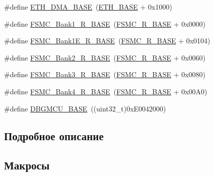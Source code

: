 \begin{DoxyCompactItemize}
\item 
\#define \mbox{\hyperlink{group___peripheral__memory__map_gace2114e1b37c1ba88d60f3e831b67e93}{E\+T\+H\+\_\+\+D\+M\+A\+\_\+\+B\+A\+SE}}~(\mbox{\hyperlink{group___peripheral__memory__map_gad965a7b1106ece575ed3da10c45c65cc}{E\+T\+H\+\_\+\+B\+A\+SE}} + 0x1000)
\item 
\#define \mbox{\hyperlink{group___peripheral__memory__map_gad196fe6f5e4041b201d14f43508c06d2}{F\+S\+M\+C\+\_\+\+Bank1\+\_\+\+R\+\_\+\+B\+A\+SE}}~(\mbox{\hyperlink{group___peripheral__memory__map_gaddf0e199dccba83272b20c9fb4d3aaed}{F\+S\+M\+C\+\_\+\+R\+\_\+\+B\+A\+SE}} + 0x0000)
\item 
\#define \mbox{\hyperlink{group___peripheral__memory__map_gaea182589c84aee30b7f735474d8774e2}{F\+S\+M\+C\+\_\+\+Bank1\+E\+\_\+\+R\+\_\+\+B\+A\+SE}}~(\mbox{\hyperlink{group___peripheral__memory__map_gaddf0e199dccba83272b20c9fb4d3aaed}{F\+S\+M\+C\+\_\+\+R\+\_\+\+B\+A\+SE}} + 0x0104)
\item 
\#define \mbox{\hyperlink{group___peripheral__memory__map_ga3cb46d62f4f6458e186a5a4c753e4918}{F\+S\+M\+C\+\_\+\+Bank2\+\_\+\+R\+\_\+\+B\+A\+SE}}~(\mbox{\hyperlink{group___peripheral__memory__map_gaddf0e199dccba83272b20c9fb4d3aaed}{F\+S\+M\+C\+\_\+\+R\+\_\+\+B\+A\+SE}} + 0x0060)
\item 
\#define \mbox{\hyperlink{group___peripheral__memory__map_gacf056152c9e5aefcc67db78d1302c0d7}{F\+S\+M\+C\+\_\+\+Bank3\+\_\+\+R\+\_\+\+B\+A\+SE}}~(\mbox{\hyperlink{group___peripheral__memory__map_gaddf0e199dccba83272b20c9fb4d3aaed}{F\+S\+M\+C\+\_\+\+R\+\_\+\+B\+A\+SE}} + 0x0080)
\item 
\#define \mbox{\hyperlink{group___peripheral__memory__map_gaf9e5417133160b0bdd0498d982acec19}{F\+S\+M\+C\+\_\+\+Bank4\+\_\+\+R\+\_\+\+B\+A\+SE}}~(\mbox{\hyperlink{group___peripheral__memory__map_gaddf0e199dccba83272b20c9fb4d3aaed}{F\+S\+M\+C\+\_\+\+R\+\_\+\+B\+A\+SE}} + 0x00\+A0)
\item 
\#define \mbox{\hyperlink{group___peripheral__memory__map_ga4adaf4fd82ccc3a538f1f27a70cdbbef}{D\+B\+G\+M\+C\+U\+\_\+\+B\+A\+SE}}~((uint32\+\_\+t)0x\+E0042000)
\end{DoxyCompactItemize}


\subsection{Подробное описание}


\subsection{Макросы}
\mbox{\label{group___peripheral__memory__map_ga695c9a2f892363a1c942405c8d351b91}} 
